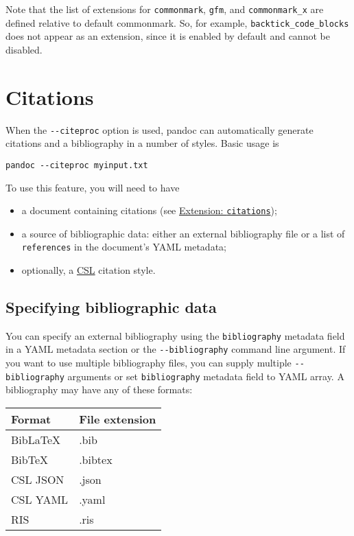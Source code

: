 \documentclass[
]{article}
\providecommand{\tightlist}{%
  \setlength{\itemsep}{0pt}\setlength{\parskip}{0pt}}
\begin{document}
Note that the list of extensions for \texttt{commonmark}, \texttt{gfm},
and \texttt{commonmark\_x} are defined relative to default commonmark.
So, for example, \texttt{backtick\_code\_blocks} does not appear as an
extension, since it is enabled by default and cannot be disabled.

\hypertarget{citations}{%
\section{Citations}\label{citations}}

When the \texttt{-\/-citeproc} option is used, pandoc can automatically
generate citations and a bibliography in a number of styles. Basic usage
is

\begin{verbatim}
pandoc --citeproc myinput.txt
\end{verbatim}

To use this feature, you will need to have

\begin{itemize}
\tightlist
\item
  a document containing citations (see
  \protect\hyperlink{extension-citations}{Extension:
  \texttt{citations}});
\item
  a source of bibliographic data: either an external bibliography file
  or a list of \texttt{references} in the document's YAML metadata;
\item
  optionally, a
  \href{https://docs.citationstyles.org/en/stable/specification.html}{CSL}
  citation style.
\end{itemize}

\hypertarget{specifying-bibliographic-data}{%
\subsection{Specifying bibliographic
data}\label{specifying-bibliographic-data}}

You can specify an external bibliography using the \texttt{bibliography}
metadata field in a YAML metadata section or the
\texttt{-\/-bibliography} command line argument. If you want to use
multiple bibliography files, you can supply multiple
\texttt{-\/-bibliography} arguments or set \texttt{bibliography}
metadata field to YAML array. A bibliography may have any of these
formats:

\begin{longtable}[]{@{}ll@{}}
\toprule()
Format & File extension \\
\midrule()
\endhead
BibLaTeX & .bib \\
BibTeX & .bibtex \\
CSL JSON & .json \\
CSL YAML & .yaml \\
RIS & .ris \\
\bottomrule()
\end{longtable}
\end{document}
